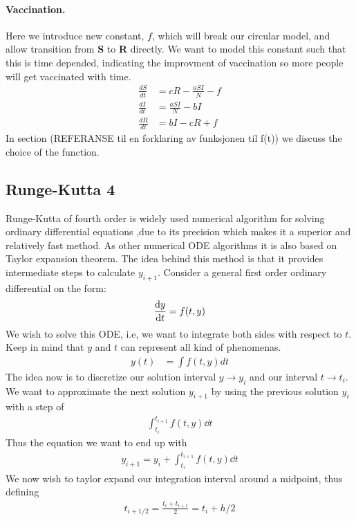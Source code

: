 \documentclass[a4paper, 10pt]{article}
\begin{document}
\paragraph{Vaccination.}\label{sec:SIRS4}  Here we introduce new constant, $f$,
which will break our circular model, and allow transition from \textbf{S} to
\textbf{R} directly. We want to model this constant such that this is time
depended, indicating the improvment of vaccination so more people will get
vaccinated with time.
\begin{align*}
  \frac{dS}{dt} &= cR - \frac{aSI}{N} - f\\
  \frac{dI}{dt} &= \frac{aSI}{N} - bI \\
  \frac{dR}{dt} &= bI - cR + f
\end{align*}
In section (REFERANSE til en forklaring av funksjonen til f(t)) we discuss the
choice of the function.

\subsection{Runge-Kutta 4}
Runge-Kutta of fourth order is widely used numerical algorithm for solving ordinary differential equations
,due to its precision which makes it a superior and relatively fast method. As other numerical ODE algorithms it is also based on Taylor expansion theorem.
The idea behind this method is that it provides intermediate steps to calculate
$y_{i+1}$.
Consider a general first order ordinary differential on the form:
\begin{align}
  \dv{y}{t} = f(t,y)
\end{align}
We wish to solve this ODE, i.e, we want to integrate both sides with respect to $t$.
Keep in mind that $y$ and $t$ can represent all kind of phenomenas.
\begin{align}
  y(t) &= \int f(t,y) dt
\end{align}
The idea now is to discretize our solution interval $y \to y_{i}$ and our interval $t \to t_{i}$.
We want to approximate the next solution $y_{i+1}$ by using the previous solution $y_{i}$ with a
step of
\begin{align}
  \int_{t_{i}}^{t_{i+1}}f(t,y)\dd{t}
\end{align}
Thus the equation we want to end up with
\begin{align}
  y_{i+1} = y_{i} + \int_{t_{i}}^{t_{i+1}}f(t,y)\dd{t}
\end{align}
We now wish to taylor expand our integration interval around a midpoint, thus defining
\begin{align}
  t_{i+1/2} = \frac{t_{i} + t_{i+1}}{2} = t_{i} + h/2
\end{align}
\end{document}
